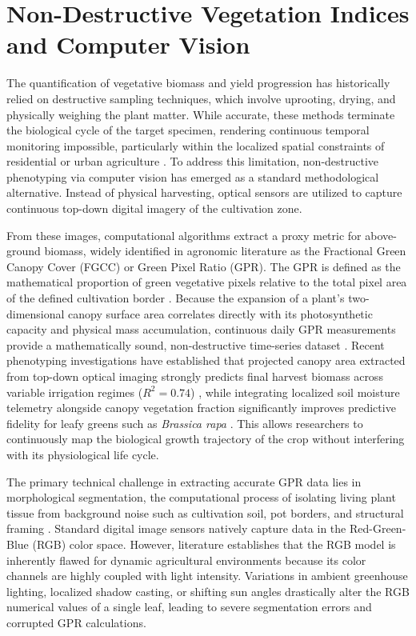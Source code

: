 \section{Non-Destructive Vegetation Indices and Computer Vision}

The quantification of vegetative biomass and yield progression has historically relied on destructive sampling techniques, which involve uprooting, drying, and physically weighing the plant matter. While accurate, these methods terminate the biological cycle of the target specimen, rendering continuous temporal monitoring impossible, particularly within the localized spatial constraints of residential or urban agriculture \cite{Ge2016}. To address this limitation, non-destructive phenotyping via computer vision has emerged as a standard methodological alternative. Instead of physical harvesting, optical sensors are utilized to capture continuous top-down digital imagery of the cultivation zone.

From these images, computational algorithms extract a proxy metric for above-ground biomass, widely identified in agronomic literature as the Fractional Green Canopy Cover (FGCC) or Green Pixel Ratio (GPR). The GPR is defined as the mathematical proportion of green vegetative pixels relative to the total pixel area of the defined cultivation border \cite{Patrignani2015}. Because the expansion of a plant's two-dimensional canopy surface area correlates directly with its photosynthetic capacity and physical mass accumulation, continuous daily GPR measurements provide a mathematically sound, non-destructive time-series dataset \cite{Patrignani2015}. Recent phenotyping investigations have established that projected canopy area extracted from top-down optical imaging strongly predicts final harvest biomass across variable irrigation regimes ($R^2 = 0.74$) \cite{Kim2022}, while integrating localized soil moisture telemetry alongside canopy vegetation fraction significantly improves predictive fidelity for leafy greens such as \textit{Brassica rapa} \cite{Lee2024}. This allows researchers to continuously map the biological growth trajectory of the crop without interfering with its physiological life cycle.

The primary technical challenge in extracting accurate GPR data lies in morphological segmentation, the computational process of isolating living plant tissue from background noise such as cultivation soil, pot borders, and structural framing \cite{Hamuda2016}. Standard digital image sensors natively capture data in the Red-Green-Blue (RGB) color space. However, literature establishes that the RGB model is inherently flawed for dynamic agricultural environments because its color channels are highly coupled with light intensity. Variations in ambient greenhouse lighting, localized shadow casting, or shifting sun angles drastically alter the RGB numerical values of a single leaf, leading to severe segmentation errors and corrupted GPR calculations.

